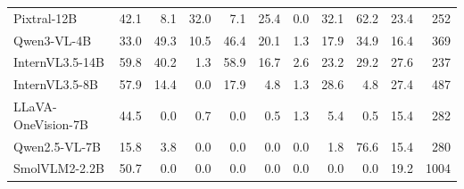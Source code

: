 \begin{table}[t]
\begin{minipage}{.98\textwidth}
\begin{tabular}{@{}lrrrrrrrrrr@{}}
Pixtral-12B & 42.1 & 8.1 & 32.0 & 7.1 & 25.4 & 0.0 & 32.1 & 62.2 & 23.4 & 252\\
Qwen3-VL-4B & 33.0 & 49.3 & 10.5 & 46.4 & 20.1 & 1.3 & 17.9 & 34.9 & 16.4 & 369\\
InternVL3.5-14B & 59.8 & 40.2 & 1.3 & 58.9 & 16.7 & 2.6 & 23.2 & 29.2 & 27.6 & 237\\
InternVL3.5-8B & 57.9 & 14.4 & 0.0 & 17.9 & 4.8 & 1.3 & 28.6 & 4.8 & 27.4 & 487\\
LLaVA-OneVision-7B & 44.5 & 0.0 & 0.7 & 0.0 & 0.5 & 1.3 & 5.4 & 0.5 & 15.4 & 282\\
Qwen2.5-VL-7B & 15.8 & 3.8 & 0.0 & 0.0 & 0.0 & 0.0 & 1.8 & 76.6 & 15.4 & 280\\
SmolVLM2-2.2B & 50.7 & 0.0 & 0.0 & 0.0 & 0.0 & 0.0 & 0.0 & 0.0 & 19.2 & 1004\\
\bottomrule\end{tabular}\end{minipage}\end{table}
